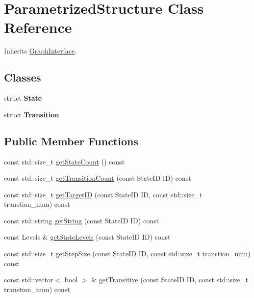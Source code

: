 \hypertarget{class_parametrized_structure}{\section{Parametrized\-Structure Class Reference}
\label{class_parametrized_structure}
}


Inherits \hyperlink{class_graph_interface}{Graph\-Interface}.

\subsection*{Classes}
\begin{DoxyCompactItemize}
\item 
struct {\bfseries State}
\item 
struct {\bfseries Transition}
\end{DoxyCompactItemize}
\subsection*{Public Member Functions}
\begin{DoxyCompactItemize}
\item 
const std\-::size\-\_\-t \hyperlink{class_parametrized_structure_a399360e838de958d3ba86e5c4866b76e}{get\-State\-Count} () const 
\item 
const std\-::size\-\_\-t \hyperlink{class_parametrized_structure_a813291746782f1e1e1a11afaf7bf8133}{get\-Transition\-Count} (const State\-I\-D I\-D) const 
\item 
const std\-::size\-\_\-t \hyperlink{class_parametrized_structure_ab2752cca4fb6821cb797a61d5d09735c}{get\-Target\-I\-D} (const State\-I\-D I\-D, const std\-::size\-\_\-t transtion\-\_\-num) const 
\item 
const std\-::string \hyperlink{class_parametrized_structure_a3c3c0bf6d17d97d68ee72324c6ea5b07}{get\-String} (const State\-I\-D I\-D) const 
\item 
const Levels \& \hyperlink{class_parametrized_structure_ab344a7d530e957c2ef93325863ce23a9}{get\-State\-Levels} (const State\-I\-D I\-D) const 
\item 
const std\-::size\-\_\-t \hyperlink{class_parametrized_structure_a12bd0d9dd633bd94a04232d546b28972}{get\-Step\-Size} (const State\-I\-D I\-D, const std\-::size\-\_\-t transtion\-\_\-num) const 
\item 
const std\-::vector$<$ bool $>$ \& \hyperlink{class_parametrized_structure_aea25bb7c6e52090936ba18b45a169f24}{get\-Transitive} (const State\-I\-D I\-D, const std\-::size\-\_\-t transtion\-\_\-num) const 
\end{DoxyCompactItemize}
